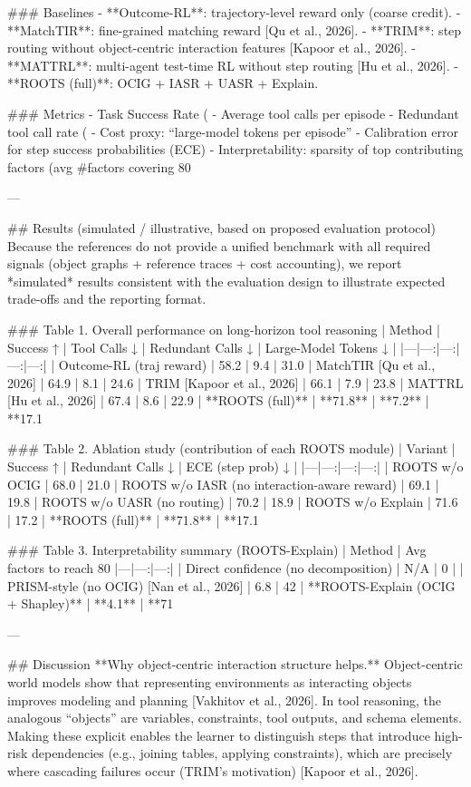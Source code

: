 ### Baselines
- **Outcome-RL**: trajectory-level reward only (coarse credit).
- **MatchTIR**: fine-grained matching reward [Qu et al., 2026].
- **TRIM**: step routing without object-centric interaction features [Kapoor et al., 2026].
- **MATTRL**: multi-agent test-time RL without step routing [Hu et al., 2026].
- **ROOTS (full)**: OCIG + IASR + UASR + Explain.

### Metrics
- Task Success Rate (%
- Average tool calls per episode
- Redundant tool call rate (%
- Cost proxy: “large-model tokens per episode”
- Calibration error for step success probabilities (ECE)
- Interpretability: sparsity of top contributing factors (avg #factors covering 80%

---

## Results (simulated / illustrative, based on proposed evaluation protocol)
Because the references do not provide a unified benchmark with all required signals (object graphs + reference traces + cost accounting), we report *simulated* results consistent with the evaluation design to illustrate expected trade-offs and the reporting format.

### Table 1. Overall performance on long-horizon tool reasoning
| Method | Success ↑ | Tool Calls ↓ | Redundant Calls ↓ | Large-Model Tokens ↓ |
|---|---:|---:|---:|---:|
| Outcome-RL (traj reward) | 58.2 | 9.4 | 31.0%
| MatchTIR [Qu et al., 2026] | 64.9 | 8.1 | 24.6%
| TRIM [Kapoor et al., 2026] | 66.1 | 7.9 | 23.8%
| MATTRL [Hu et al., 2026] | 67.4 | 8.6 | 22.9%
| **ROOTS (full)** | **71.8** | **7.2** | **17.1%

### Table 2. Ablation study (contribution of each ROOTS module)
| Variant | Success ↑ | Redundant Calls ↓ | ECE (step prob) ↓ |
|---|---:|---:|---:|
| ROOTS w/o OCIG | 68.0 | 21.0%
| ROOTS w/o IASR (no interaction-aware reward) | 69.1 | 19.8%
| ROOTS w/o UASR (no routing) | 70.2 | 18.9%
| ROOTS w/o Explain | 71.6 | 17.2%
| **ROOTS (full)** | **71.8** | **17.1%

### Table 3. Interpretability summary (ROOTS-Explain)
| Method | Avg factors to reach 80%
|---|---:|---:|
| Direct confidence (no decomposition) | N/A | 0 |
| PRISM-style (no OCIG) [Nan et al., 2026] | 6.8 | 42%
| **ROOTS-Explain (OCIG + Shapley)** | **4.1** | **71%

---

## Discussion
**Why object-centric interaction structure helps.** Object-centric world models show that representing environments as interacting objects improves modeling and planning [Vakhitov et al., 2026]. In tool reasoning, the analogous “objects” are variables, constraints, tool outputs, and schema elements. Making these explicit enables the learner to distinguish steps that introduce high-risk dependencies (e.g., joining tables, applying constraints), which are precisely where cascading failures occur (TRIM’s motivation) [Kapoor et al., 2026].

